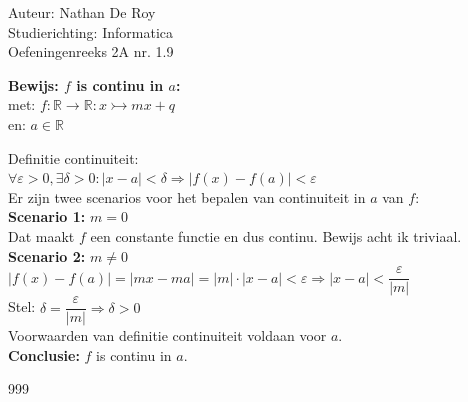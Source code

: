 \documentclass[a4paper]{article}
\begin{document}
\noindent \large Auteur: Nathan De Roy \\
\noindent \large Studierichting: Informatica\\
\noindent \large Oefeningenreeks 2A nr. 1.9\\

\medskip

\normalsize

\textbf{Bewijs: $f$ is continu in $a$:}\\

met: $f \colon \mathbb{R} \rightarrow \mathbb{R} \colon x \rightarrowtail mx + q$\\

en: $a \in \mathbb{R}$\\

\noindent

Definitie continuiteit:\\

$\forall \varepsilon > 0, \exists \delta > 0 \colon | x-a | < \delta \Rightarrow | f(x) - f(a) | < \varepsilon$\\

Er zijn twee scenarios voor het bepalen van continuiteit in $a$ van $f$:\\

\textbf{Scenario 1: } $m = 0$\\

Dat maakt $f$ een constante functie en dus continu. Bewijs acht ik triviaal.\\

\textbf{Scenario 2: } $m \neq 0$\\

$| f(x) - f(a)  | =  | mx - ma  | =  | m  | \cdot | x- a  | < \varepsilon \Rightarrow  | x - a  | < \dfrac{\varepsilon}{ | m  |}$\\

Stel: $\delta = \dfrac{\varepsilon}{ | m  |} \Rightarrow \delta > 0$\\

Voorwaarden van definitie continuiteit voldaan voor $a$.\\

\textbf{Conclusie: } $f$ is continu in $a$.\\

\begin{thebibliography}{999}

\end{thebibliography}
\end{document}
